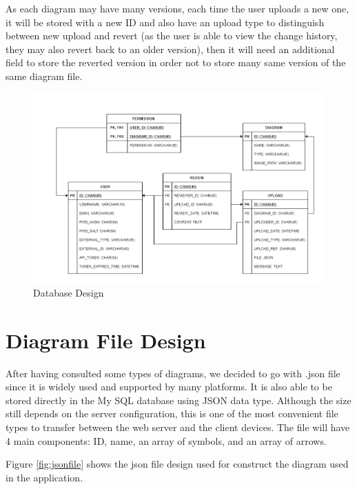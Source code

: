 As each diagram may have many versions, each time the user uploads a new one, it will be stored with a new ID and also have an upload type to distinguish between new upload and revert (as the user is able to view the change history, they may also revert back to an older version), then it will need an additional field to store the reverted version in order not to store many same version of the same diagram file.

\begin{figure}[!b]
\includegraphics[width=16cm]{Images/App/DB.png}
\caption{Database Design}
\end{figure}

\section{Diagram File Design}
After having consulted some types of diagrams, we decided to go with .json file since it is widely used and supported by many platforms. It is also able to be stored directly in the My SQL database using JSON data type. Although the size still depends on the server configuration, this is one of the most convenient file types to transfer between the web server and the client devices. The file will have 4 main components: ID, name, an array of symbols, and an array of arrows.

Figure \ref{fig:jsonfile} shows the json file design used for construct the diagram used in the application.

